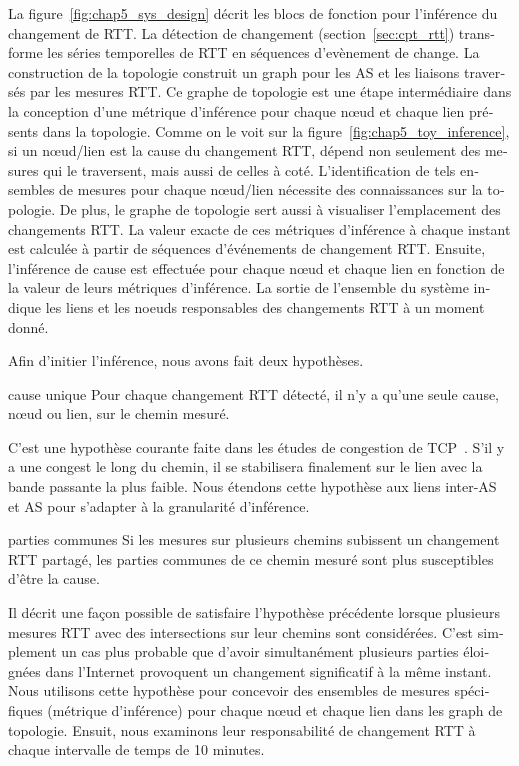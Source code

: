 \begin{otherlanguage}{french}
La figure~\ref{fig:chap5_sys_design} décrit les blocs de fonction pour l'inférence du changement de RTT. 
La détection de changement (section~\ref {sec:cpt_rtt}) transforme les séries temporelles de RTT en séquences d'evènement de change.
La construction de la topologie construit un graph pour les AS et les liaisons traversés par les mesures RTT.
Ce graphe de topologie est une étape intermédiaire dans la conception d'une métrique d'inférence pour chaque nœud et chaque lien présents dans la topologie. 
Comme on le voit sur la figure~\ref {fig:chap5_toy_inference}, si un nœud/lien est la cause du changement RTT, 
dépend non seulement des mesures qui le traversent, mais aussi de celles à coté. 
L'identification de tels ensembles de mesures pour chaque nœud/lien nécessite des connaissances sur la topologie. 
De plus, le graphe de topologie sert aussi à visualiser l'emplacement des changements RTT.
La valeur exacte de ces métriques d'inférence à chaque instant est calculée à partir de séquences d'événements de changement RTT. 
Ensuite, l'inférence de cause est effectuée pour chaque nœud et chaque lien en fonction de la valeur de leurs métriques d'inférence.
La sortie de l'ensemble du système indique les liens et les noeuds responsables des changements RTT à un moment donné.

Afin d'initier l'inférence, nous avons fait deux hypothèses.
\begin{assumption}{1}{cause unique}
Pour chaque changement RTT détecté, il n'y a qu'une seule cause, nœud ou lien, sur le chemin mesuré.
\end{assumption}
C'est une hypothèse courante faite dans les études de congestion de TCP~\cite{mathis1997macroscopic, Cardwell2016}. 
S'il y a une congest le long du chemin, il se stabilisera finalement sur le lien avec la bande passante la plus faible.
Nous étendons cette hypothèse aux liens inter-AS et AS pour s'adapter à la granularité d'inférence.

\begin{assumption}{2}{parties communes}
Si les mesures sur plusieurs chemins subissent un changement RTT partagé, les parties communes de ce chemin mesuré sont plus susceptibles d'être la cause.
\end{assumption}
Il décrit une façon possible de satisfaire l'hypothèse précédente lorsque plusieurs mesures RTT avec des intersections sur leur chemins sont considérées.
C'est simplement un cas plus probable que d'avoir simultanément plusieurs parties éloignées dans l'Internet provoquent un changement significatif à la même instant. 
Nous utilisons cette hypothèse pour concevoir des ensembles de mesures spécifiques (métrique d'inférence) pour chaque nœud et chaque lien dans les graph de topologie.
Ensuit, nous examinons leur responsabilité de changement RTT à chaque intervalle de temps de 10 minutes.


\end{otherlanguage}
